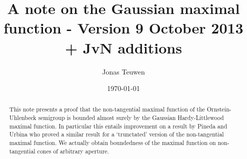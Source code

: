 \documentclass[a4paper,oneside,10pt]{amsproc}
\title[Gaussian maximal functions]{A note on the Gaussian maximal
  function - Version 9 October 2013 + JvN additions}
\author{Jonas Teuwen}%
\date{\today}
\theoremstyle{remark}
\begin{document}
\begin{abstract}
  This note presents a proof that 
  the non-tangential maximal function of the Ornstein-Uhlenbeck semigroup
  is bounded almost surely by the Gaussian Hardy-Littlewood maximal
  function.  In particular this entails improvement on a result by
  Pineda and Urbina \cite{Pineda2008} who proved a similar result for 
  a `trunctated' version of the non-tangential maximal function. 
  We actually obtain boundedness of the maximal function on non-tangential
  cones of arbitrary aperture.
\end{abstract}


\maketitle
\end{document}
